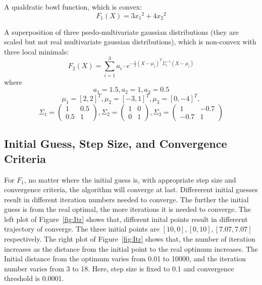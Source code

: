 A qualdratic bowl function, which is convex:
\begin{equation}
F_1(X) = 3 {x_1}^2+4 {x_2}^2
\end{equation}

A superposition of three psedo-multivariate gaussian distributions (they are scaled but not real multivariate gaussian distributions), which is non-convex with three local minimals:
\begin{equation}
F_2(X) = \sum_{i=1}^3 a_i \cdot e^{-\frac{1}{2} (X - \mu_i)^T \Sigma_i ^{-1} (X - \mu_i)}
\end{equation}
where 
\[
a_1 = 1.5, a_2 = 1, a_3 = 0.5
\]
\[
\mu_1 = [2, 2]^T, \mu_2 = [-3,1]^T, \mu_3 = [0,-4]^T,\]
\[
\Sigma_1 =\left( \begin{array}{ccc}
1 & 0.5 \\
0.5 & 1  \end{array} \right),
\Sigma_2 =\left( \begin{array}{ccc}
1 & 0 \\
0 & 1  \end{array} \right),
\Sigma_3 =\left( \begin{array}{ccc}
1 & -0.7 \\
-0.7 & 1  \end{array} \right)
\]




\subsection{Initial Guess, Step Size, and Convergence Criteria}

For $F_1$, no matter where the initial guess is, with appropriate step size and convergence criteria, the algorithm will converge at last. Differerent initial guesses result in different iteration numbers needed to converge. The further the initial guess is from the real optimal, the more iterations it is needed to converge. The left plot of Figure~\ref{fig:Itr} shows that, different inital points result in differernt trajectory of converge. The three initial points are $[10,0], [0,10], [7.07,7.07]$ respectively. The right plot of Figure~\ref{fig:Itr} shows that, the number of iteration increases as the distance from the initial point to the real optimum increases. The Initial distance from the optimum varies from 0.01 to 10000, and the iteration number varies from 3 to 18. Here, step size is fixed to 0.1 and convergence threshold is 0.0001.

